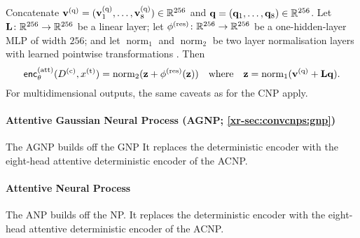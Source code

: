 \documentclass[12pt]{report}
\newcommand{\xrprefix}[1]{xr-#1}
\begin{document}
Concatenate $\vv\us{(q)} = (\vv_1\us{(q)}, \ldots, \vv_8\us{(q)}) \in \R^{256} $ and $\mathbf{q} = (\mathbf{q}_1, \ldots, \mathbf{q}_8) \in \mathbb{R}^{256}$.
Let $\mathbf{L} \colon \mathbb{R}^{256} \to \mathbb{R}^{256}$ be a linear layer;
let $\phi\us{(res)}\colon \R^{256} \to \R^{256}$ be a one-hidden-layer MLP of width $256$;
and let $\operatorname{norm}_1$ and $\operatorname{norm}_2$ be two layer normalisation layers with learned pointwise transformations \parencite{Ba:2016:Layer_Normalization}.
Then
\begin{equation}
    \enc_\theta\us{(att)}(D\us{(c)}, x\us{(t)})
    = \operatorname{norm}_2(\vz + \phi\us{(res)}(\vz))
    \quad\text{where}\quad
    \vz = \operatorname{norm}_1(\vv\us{(q)} + \mL \vq).
\end{equation}
For multidimensional outputs, the same caveats as for the CNP apply.

\paragraph{Attentive Gaussian Neural Process (AGNP; \cref{\xrprefix{sec:convcnps:gnp}})}
The AGNP builds off the GNP
It replaces the deterministic encoder with the eight-head attentive deterministic encoder of the ACNP.

\paragraph{Attentive Neural Process \parencite[ANP;][]{Kim:2019:Attentive_Neural_Processes}}
The ANP builds off the NP.
It replaces the deterministic encoder with the eight-head attentive deterministic encoder of the ACNP.
\end{document}
